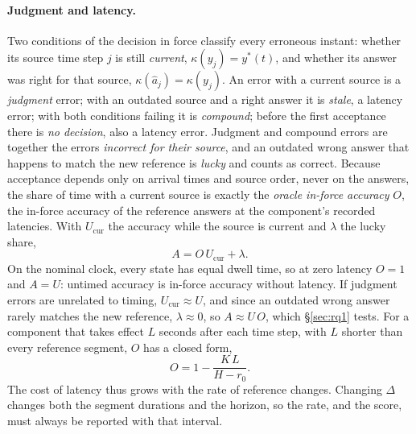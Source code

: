 \documentclass[11pt]{article}
\newcommand{\yref}{y^{*}}
\begin{document}
\paragraph{Judgment and latency.}
Two conditions of the decision in force classify every erroneous instant: whether its source time step $j$ is still \emph{current}, $\kappa(y_j)=\yref(t)$, and whether its answer was right for that source, $\kappa(\hat a_j)=\kappa(y_j)$.
An error with a current source is a \emph{judgment} error; with an outdated source and a right answer it is \emph{stale}, a latency error; with both conditions failing it is \emph{compound}; before the first acceptance there is \emph{no decision}, also a latency error.
Judgment and compound errors are together the errors \emph{incorrect for their source}, and an outdated wrong answer that happens to match the new reference is \emph{lucky} and counts as correct.
Because acceptance depends only on arrival times and source order, never on the answers, the share of time with a current source is exactly the \emph{oracle in-force accuracy} $O$, the in-force accuracy of the reference answers at the component's recorded latencies.
With $U_{\mathrm{cur}}$ the accuracy while the source is current and $\lambda$ the lucky share,
\begin{equation}
  A=O\,U_{\mathrm{cur}}+\lambda .
  \label{eq:factor}
\end{equation}
On the nominal clock, every state has equal dwell time, so at zero latency $O=1$ and $A=U$: untimed accuracy is in-force accuracy without latency.
If judgment errors are unrelated to timing, $U_{\mathrm{cur}}\approx U$, and since an outdated wrong answer rarely matches the new reference, $\lambda\approx 0$, so $A\approx U\,O$, which \S\ref{sec:rq1} tests.
For a component that takes effect $L$ seconds after each time step, with $L$ shorter than every reference segment, $O$ has a closed form,
\begin{equation}
  O=1-\frac{K\,L}{H-r_0}.
  \label{eq:delay}
\end{equation}
The cost of latency thus grows with the rate of reference changes. Changing $\Delta$ changes both the segment durations and the horizon, so the rate, and the score, must always be reported with that interval.
\end{document}
